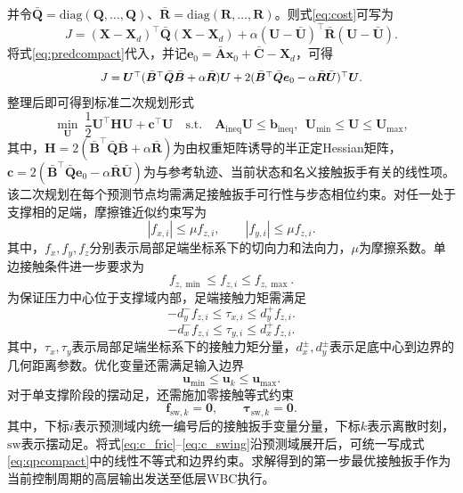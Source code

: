 ﻿\documentclass[preprint,12pt]{elsarticle}
\begin{document}
并令$\bar{\bm Q}=\mathrm{diag}(\bm Q,\ldots,\bm Q)$、$\bar{\bm R}=\mathrm{diag}(\bm R,\ldots,\bm R)$。则式\eqref{eq:cost}可写为
\begin{equation}
J=(\bm X-\bm X_d)^\top\bar{\bm Q}(\bm X-\bm X_d)
+\alpha(\bm U-\bar{\bm U})^\top\bar{\bm R}(\bm U-\bar{\bm U}).
\label{eq:stacked_cost}
\end{equation}
将式\eqref{eq:predcompact}代入，并记$\bm e_0=\bar{\bm A}\bm x_0+\bar{\bm C}-\bm X_d$，可得
\begin{equation}
\scalebox{0.92}{$
J=\bm U^\top(\bar{\bm B}^\top\bar{\bm Q}\bar{\bm B}+\alpha\bar{\bm R})\bm U
+2(\bar{\bm B}^\top\bar{\bm Q}\bm e_0-\alpha\bar{\bm R}\bar{\bm U})^\top\bm U.
$}
\label{eq:expanded_cost}
\end{equation}
整理后即可得到标准二次规划形式\begin{equation}
\min_{\bm U}\ \frac{1}{2}\bm U^\top \bm H\bm U+\bm c^\top\bm U
\quad
\text{s.t.}\quad
\bm A_{\text{ineq}}\bm U\le \bm b_{\text{ineq}},\ \
\bm U_{\min}\le \bm U\le \bm U_{\max},
\label{eq:qpcompact}
\end{equation}
其中，$\bm H=2(\bar{\bm B}^\top\bar{\bm Q}\bar{\bm B}+\alpha\bar{\bm R})$为由权重矩阵诱导的半正定Hessian矩阵，$\bm c=2(\bar{\bm B}^\top\bar{\bm Q}\bm e_0-\alpha\bar{\bm R}\bar{\bm U})$为与参考轨迹、当前状态和名义接触扳手有关的线性项。该二次规划在每个预测节点均需满足接触扳手可行性与步态相位约束。对任一处于支撑相的足端，摩擦锥近似约束写为
\begin{equation}
|f_{x,i}|\le \mu f_{z,i},\qquad |f_{y,i}|\le \mu f_{z,i}.
\label{eq:c_fric}
\end{equation}
其中，$f_x,f_y,f_z$分别表示局部足端坐标系下的切向力和法向力，$\mu$为摩擦系数。单边接触条件进一步要求为\begin{equation}
f_{z,\min}\le f_{z,i}\le f_{z,\max}.
\label{eq:c_normal}
\end{equation}
为保证压力中心位于支撑域内部，足端接触力矩需满足
\begin{equation}
-d_y^- f_{z,i}\le \tau_{x,i}\le d_y^+ f_{z,i}.
\label{eq:c_copx}
\end{equation}
\begin{equation}
-d_x^- f_{z,i}\le \tau_{y,i}\le d_x^+ f_{z,i}.
\label{eq:c_copy}
\end{equation}
其中，$\tau_x,\tau_y$表示局部足端坐标系下的接触力矩分量，$d_x^\pm,d_y^\pm$表示足底中心到边界的几何距离参数。优化变量还需满足输入边界
\begin{equation}
\bm u_{\min}\le \bm u_k\le \bm u_{\max}.
\label{eq:c_bound}
\end{equation}
对于单支撑阶段的摆动足，还需施加零接触等式约束\begin{equation}
\bm f_{\text{sw},k}=\bm 0,\qquad \bm\tau_{\text{sw},k}=\bm 0.
\label{eq:c_swing}
\end{equation}
其中，下标$i$表示预测域内统一编号后的接触扳手变量分量，下标$k$表示离散时刻，$\text{sw}$表示摆动足。将式\eqref{eq:c_fric}--\eqref{eq:c_swing}沿预测域展开后，可统一写成式\eqref{eq:qpcompact}中的线性不等式和边界约束。求解得到的第一步最优接触扳手作为当前控制周期的高层输出发送至低层WBC执行。
\end{document}
